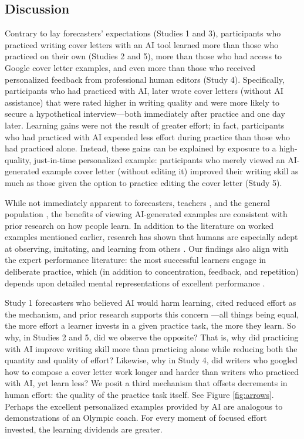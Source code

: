 \documentclass[11pt]{report}
\begin{document}
\begin{mainf}
\section*{Discussion} 

Contrary to lay forecasters' expectations (Studies 1 and 3), participants who practiced writing cover letters with an AI tool learned more than those who practiced on their own (Studies 2 and 5), more than those who had access to Google cover letter examples, and even more than those who received personalized feedback from professional human editors (Study 4). Specifically, participants who had practiced with AI, later wrote cover letters (without AI assistance) that were rated higher in writing quality and were more likely to secure a hypothetical interview---both immediately after practice and one day later.
Learning gains were not the result of greater effort; in fact, participants who had practiced with AI expended less effort during practice than those who had practiced alone. Instead, these gains can be explained by exposure to a high-quality, just-in-time personalized example: participants who merely viewed an AI-generated example cover letter (without editing it) improved their writing skill as much as those given the option to practice editing the cover letter (Study 5).

While not immediately apparent to forecasters, teachers \cite{lin2024a}, and the general population \cite{hawkins2024between}, the benefits of viewing AI-generated examples are consistent with prior research on how people learn. 
 In addition to the literature on worked examples mentioned earlier, research has shown that humans are especially adept at observing, imitating, and learning from others \cite{bandura1971, meltzoff2005imitation, lyons2007hidden}. 
  Our findings also align with the expert performance literature: the most successful learners engage in deliberate practice, which (in addition to concentration, feedback, and repetition) depends upon detailed mental representations of excellent performance \cite{anders2008deliberate}.

Study 1 forecasters who believed AI would harm learning, cited reduced effort as the mechanism, and prior research supports this concern \cite{melumad2025experimental, kosmyna2025your}---all things being equal, the more effort a learner invests in a given practice task, the more they learn. So why, in Studies 2 and 5, did we observe the opposite? That is, why did practicing with AI improve writing skill more than practicing alone while reducing both the quantity and quality of effort? Likewise, why in Study 4, did writers who googled how to compose a cover letter work longer and harder than writers who practiced with AI, yet learn less? We posit a third mechanism that offsets decrements in human effort: the quality of the practice task itself. See Figure \ref{fig:arrows}. Perhaps the excellent personalized examples provided by AI are analogous to demonstrations of an Olympic coach. For every moment of focused effort invested, the learning dividends are greater. 


\end{mainf}
\end{document}
